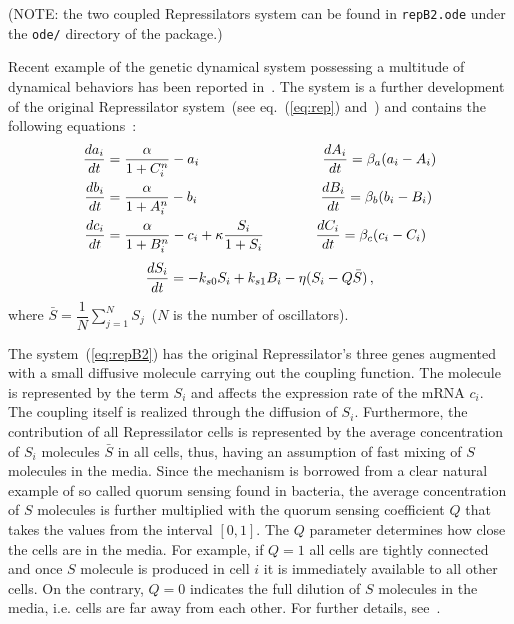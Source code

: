 \documentclass[11pt,a4paper]{article}
\begin{document}
(NOTE: the two coupled Repressilators system can be found in \texttt{repB2.ode} under
the \texttt{ode/} directory of the package.)

Recent example of the genetic dynamical system possessing a multitude of dynamical
behaviors has been reported in~\cite{Ullner2007}. The system is a further development
of the original Repressilator system~(see eq.~(\ref{eq:rep}) and~\cite{Elowitz2000})
and contains the following equations~\cite{Ullner2007,Ullner2008,Garcia2004}:
\begin{align}
  \label{eq:repB2}
  \begin{split}
    \dfrac{da_i}{dt} &= \dfrac{\alpha}{1+C_i^n} - a_i \hspace{3.1cm} \dfrac{dA_i}{dt} = \beta_a(a_i-A_i)\\
    \dfrac{db_i}{dt} &= \dfrac{\alpha}{1+A_i^n} - b_i \hspace{3.1cm} \dfrac{dB_i}{dt} = \beta_b(b_i-B_i)\\
    \dfrac{dc_i}{dt} &= \dfrac{\alpha}{1+B_i^n} - c_i + \kappa\frac{S_i}{1+S_i} \hspace{1.3cm} \dfrac{dC_i}{dt} = \beta_c(c_i-C_i)\\
  \end{split}
\end{align}
\begin{equation}
  \notag
  \dfrac{dS_i}{dt} = -k_{s0}S_i + k_{s1}B_i - \eta(S_i - Q\bar S)\,,
\end{equation}
where $\bar S = \dfrac{1}{N}\sum\limits_{j=1}^NS_j$~($N$ is the number of
oscillators).

The system~(\ref{eq:repB2}) has the original Repressilator's three genes augmented
with a small diffusive molecule carrying out the coupling function. The molecule is
represented by the term $S_i$ and affects the expression rate of the mRNA $c_i$. The
coupling itself is realized through the diffusion of $S_i$. Furthermore, the
contribution of all Repressilator cells is represented by the average concentration
of $S_i$ molecules $\bar S$ in all cells, thus, having an assumption of fast mixing
of $S$ molecules in the media. Since the mechanism is borrowed from a clear natural
example of so called quorum sensing found in bacteria, the average concentration of
$S$ molecules is further multiplied with the quorum sensing coefficient $Q$ that
takes the values from the interval $[0,1]$. The $Q$ parameter determines how close
the cells are in the media. For example, if $Q=1$ all cells are tightly connected and
once $S$ molecule is produced in cell $i$ it is immediately available to all other
cells. On the contrary, $Q=0$ indicates the full dilution of $S$ molecules in the
media, i.e. cells are far away from each other. For further details,
see~\cite{Ullner2008}.
\end{document}
